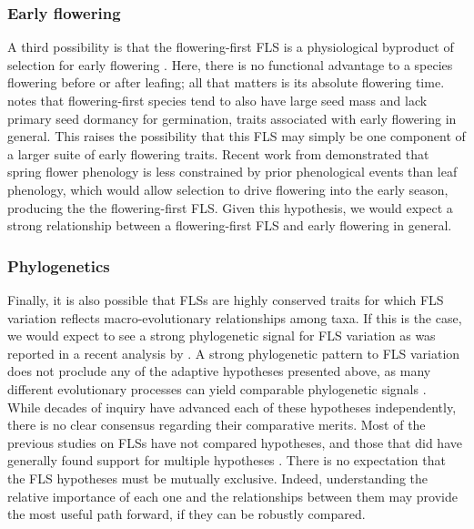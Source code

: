 \documentclass[12pt]{article}
\begin{document}
\subsubsection*{Early flowering}
\noindent A third possibility is that the flowering-first FLS is a physiological byproduct of selection for early flowering \citep{Primack1987}. Here, there is no functional advantage to a species flowering before or after leafing; all that matters is its absolute flowering time. \citet{Primack1987} notes that flowering-first species tend to also have large seed mass and lack primary seed dormancy for germination, traits associated with early flowering in general. This raises the possibility that this FLS may simply be one component of a larger suite of early flowering traits. Recent work from \citet{Savage2019} demonstrated that spring flower phenology is less constrained by prior phenological events than leaf phenology, which would allow selection to drive flowering into the early season, producing the the flowering-first FLS. Given this hypothesis, we would expect a strong relationship between a flowering-first FLS and early flowering in general.

\subsubsection*{Phylogenetics} 
\noindent Finally, it is also possible that FLSs are highly conserved traits for which FLS variation reflects macro-evolutionary relationships among taxa. If this is the case, we would expect to see a strong phylogenetic signal for FLS variation as was reported in a recent analysis by \citet{Gougherty2018}. A strong phylogenetic pattern to FLS variation does not proclude any of the adaptive hypotheses presented above, as  many different evolutionary processes can yield comparable phylogenetic signals \citep{Revell2008}. \\

\noindent While decades of inquiry have advanced each of these hypotheses independently, there is no clear consensus regarding their comparative merits. Most of the previous studies on FLSs have not compared hypotheses, and those that did have generally found support for multiple hypotheses \citep[see][]{Bolmgren2003,Gougherty2018}. There is no expectation that the FLS hypotheses must be mutually exclusive. Indeed, understanding the relative importance of each one and the relationships between them may provide the most useful path forward, if they can be robustly compared.\\
\end{document}
